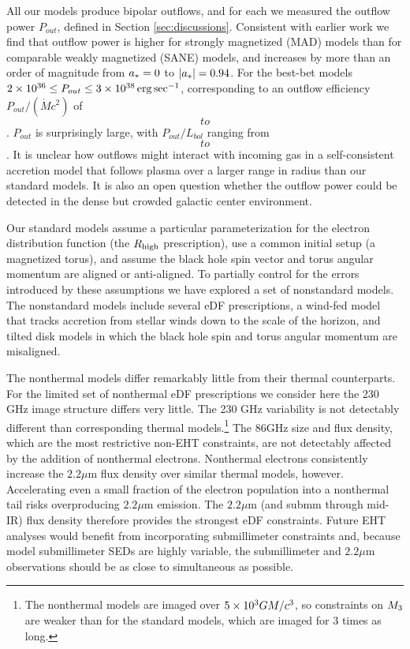 All our models produce bipolar outflows, and for each we measured the outflow power $P_{out}$, defined in Section \ref{sec:discussions}. Consistent with earlier work we find that outflow power is higher for strongly magnetized (MAD) models than for comparable weakly magnetized (SANE) models, and increases by more than an order of magnitude from $a_* = 0$ to $|a_*| = 0.94$.  For the best-bet models $2 \times 10^{36} \le P_{out} \le 3 \times 10^{38} \,\mathrm{erg} \,\mathrm{sec}^{-1}$, corresponding to an outflow efficiency $P_{out}/(\dot{M} c^2)$ of $$ to $$.  $P_{out}$ is surprisingly large, with $P_{out}/L_{bol}$ ranging from $$ to $$.  It is unclear how outflows might interact with incoming gas in a self-consistent accretion model that follows plasma over a larger range in radius than our standard models.  It is also an open question whether the outflow power could be detected in the dense but crowded galactic center environment.

Our standard models assume a particular parameterization for the electron distribution function (the $R_\mathrm{high}$ prescription), use a common initial setup (a magnetized torus), and assume the black hole spin vector and torus angular momentum are aligned or anti-aligned.  To partially control for the errors introduced by these assumptions we have explored a set of nonstandard models.  The nonstandard models include several eDF prescriptions, a wind-fed model that tracks accretion from stellar winds down to the scale of the horizon, and tilted disk models in which the black hole spin and torus angular momentum are misaligned.

The nonthermal models differ remarkably little from their thermal counterparts.  For the limited set of nonthermal eDF prescriptions we consider here the 230 GHz image structure differs very little.  The 230 GHz variability is not detectably different than corresponding thermal models.\footnote{The nonthermal models are imaged over $5\times 10^3GM/c^3$, so constraints on $M_{3}$ are weaker than for the standard models, which are imaged for 3 times as long.} The 86GHz size and flux density, which are the most restrictive non-EHT constraints, are not detectably affected by the addition of nonthermal electrons.  Nonthermal electrons consistently increase the $2.2\mu$m flux density over similar thermal models, however.  Accelerating even a small fraction of the electron population into a nonthermal tail risks overproducing $2.2\mu$m emission.  The $2.2\mu$m (and submm through mid-IR) flux density therefore provides the strongest eDF constraints.  Future EHT analyses would benefit from incorporating submillimeter constraints \citep[e.g.]{2019ApJ...881L...2B} and, because model submillimeter SEDs are highly variable, the submillimeter and $2.2\mu$m observations should be as close to simultaneous as possible.   

